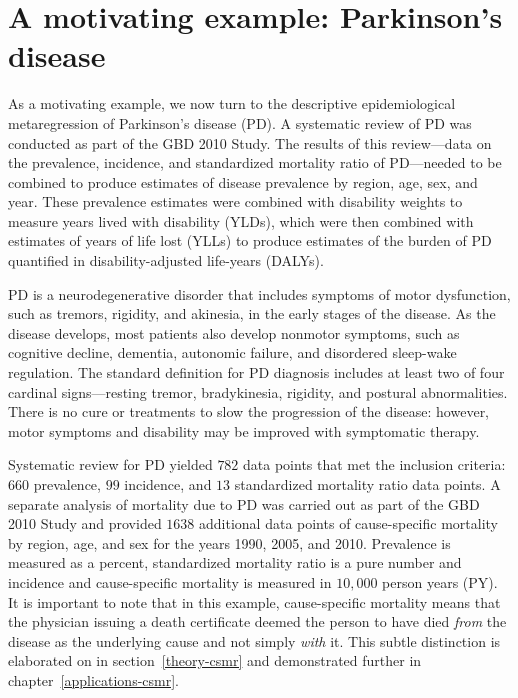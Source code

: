 \section{A motivating example: Parkinson's disease}
\label{intro-complete_ex}

As a motivating example, we now turn to the descriptive
epidemiological metaregression of Parkinson's disease (PD). A
systematic review of PD was conducted as part of the GBD 2010
Study.\cite{TK_GBD_2010_or_parkinsons_paper} The results of this
review---data on the prevalence, incidence, and standardized mortality ratio of
PD---needed to be combined to produce estimates of disease prevalence by
region, age, sex, and year.  These prevalence estimates were combined
with disability weights to measure years lived with disability (YLDs),
which were then combined with estimates of years of life lost (YLLs)
to produce estimates of the burden of PD quantified in disability-adjusted life-years (DALYs).

PD is a neurodegenerative disorder that includes symptoms of motor
dysfunction, such as tremors, rigidity, and akinesia, in the early
stages of the disease.  As the disease develops, most patients also
develop nonmotor symptoms, such as cognitive decline, dementia,
autonomic failure, and disordered sleep-wake regulation.  The standard
definition for PD diagnosis includes at least two of four cardinal
signs---resting tremor, bradykinesia, rigidity, and postural abnormalities.
There is no cure or treatments to slow the progression of the disease:
however, motor symptoms and disability may be improved with
symptomatic therapy.\cite{poewe_natural_2006, pollock_prevalence_1966, larsen_clinical_1994}

Systematic review for PD yielded $782$ data points that met the inclusion criteria: $660$
prevalence, $99$ incidence, and $13$ standardized mortality ratio data
points.  A separate analysis of
mortality due to PD was carried out as part of the GBD 2010 Study and
provided $1638$ additional data points of cause-specific mortality by
region, age, and sex for the years 1990, 2005, and 2010.  Prevalence
is measured as a percent, standardized mortality ratio is a pure number and
incidence and cause-specific mortality is measured in $10,000$ person
years (PY).  It is important to note that in this example, cause-specific mortality means
that the physician issuing a death certificate deemed the person to
have died \emph{from} the disease as the underlying cause and not
simply \emph{with} it.  This subtle distinction is elaborated on in
section~\ref{theory-csmr} and demonstrated further in
chapter~\ref{applications-csmr}.

